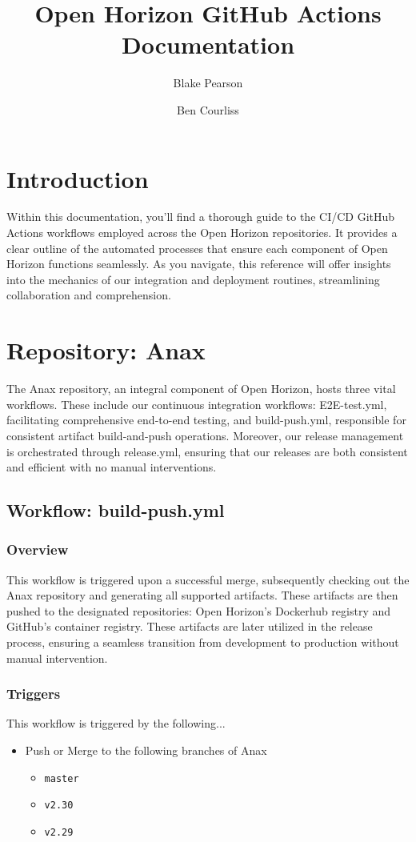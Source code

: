 \documentclass[a4paper,11pt]{article}
\date{Created: #1 \hspace{1cm} Last Updated: #2}%
\title{Open Horizon GitHub Actions Documentation}
\author[1]{Blake Pearson}
\author[2]{Ben Courliss}
\affil[1]{IBM DevOps Intern, \href{mailto:Blake.Pearson@ibm.com}{Blake.Pearson@ibm.com}}
\affil[2]{IBM DevOps Engineer, \href{mailto:bencourliss@ibm.com}{bencourliss@ibm.com}}
\begin{document}
\maketitle

\tableofcontents

\section*{Introduction}
Within this documentation, you'll find a thorough guide to the CI/CD GitHub Actions workflows employed across the Open Horizon repositories. It provides a clear outline of the automated processes that ensure each component of Open Horizon functions seamlessly. As you navigate, this reference will offer insights into the mechanics of our integration and deployment routines, streamlining collaboration and comprehension.

\newpage

\section{Repository: Anax}
The Anax repository, an integral component of Open Horizon, hosts three vital workflows. These include our continuous integration workflows: E2E-test.yml, facilitating comprehensive end-to-end testing, and build-push.yml, responsible for consistent artifact build-and-push operations. Moreover, our release management is orchestrated through release.yml, ensuring that our releases are both consistent and efficient with no manual interventions. 

\subsection{Workflow: build-push.yml}

\subsubsection{Overview}
This workflow is triggered upon a successful merge, subsequently checking out the Anax repository and generating all supported artifacts. These artifacts are then pushed to the designated repositories: Open Horizon's Dockerhub registry and GitHub's container registry. These artifacts are later utilized in the release process, ensuring a seamless transition from development to production without manual intervention.

\subsubsection{Triggers}
This workflow is triggered by the following...
\begin{itemize}
    \item Push or Merge to the following branches of Anax
    \begin{itemize}
        \item\verb|master|
        \item\verb|v2.30|
        \item\verb|v2.29|
    \end{itemize}
\end{itemize}
\end{document}
